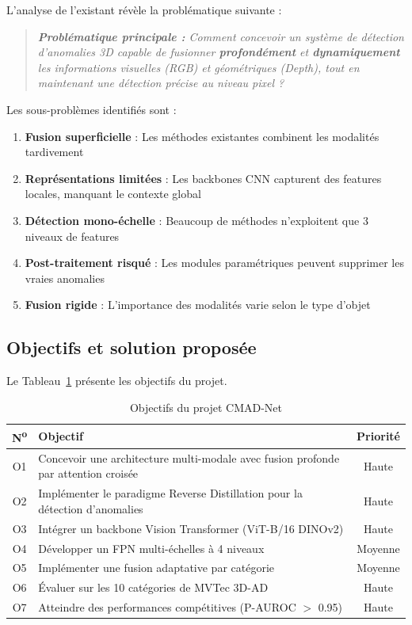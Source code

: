 \documentclass[12pt,a4paper,oneside]{report}
\begin{document}
L'analyse de l'existant révèle la problématique suivante :

\begin{quote}
\textit{\textbf{Problématique principale :} Comment concevoir un système de détection d'anomalies 3D capable de fusionner \textbf{profondément} et \textbf{dynamiquement} les informations visuelles (RGB) et géométriques (Depth), tout en maintenant une détection précise au niveau pixel ?}
\end{quote}

Les sous-problèmes identifiés sont :
\begin{enumerate}
    \item \textbf{Fusion superficielle} : Les méthodes existantes combinent les modalités tardivement
    \item \textbf{Représentations limitées} : Les backbones CNN capturent des features locales, manquant le contexte global
    \item \textbf{Détection mono-échelle} : Beaucoup de méthodes n'exploitent que 3 niveaux de features
    \item \textbf{Post-traitement risqué} : Les modules paramétriques peuvent supprimer les vraies anomalies
    \item \textbf{Fusion rigide} : L'importance des modalités varie selon le type d'objet
\end{enumerate}

\subsection{Objectifs et solution proposée}

Le Tableau~\ref{tab:objectifs} présente les objectifs du projet.

\begin{table}[H]
\centering
\caption{Objectifs du projet CMAD-Net}
\label{tab:objectifs}
\begin{tabularx}{\textwidth}{c X c}
\toprule
\textbf{N\textsuperscript{o}} & \textbf{Objectif} & \textbf{Priorité} \\
\midrule
\rowcolor{tableheader} O1 & Concevoir une architecture multi-modale avec fusion profonde par attention croisée & Haute \\
O2 & Implémenter le paradigme Reverse Distillation pour la détection d'anomalies & Haute \\
\rowcolor{tableheader} O3 & Intégrer un backbone Vision Transformer (ViT-B/16 DINOv2) & Haute \\
O4 & Développer un FPN multi-échelles à 4 niveaux & Moyenne \\
\rowcolor{tableheader} O5 & Implémenter une fusion adaptative par catégorie & Moyenne \\
O6 & Évaluer sur les 10 catégories de MVTec 3D-AD & Haute \\
\rowcolor{tableheader} O7 & Atteindre des performances compétitives (P-AUROC $>$ 0.95) & Haute \\
\bottomrule
\end{tabularx}
\end{table}
\end{document}

